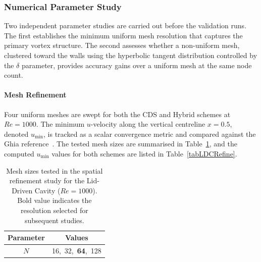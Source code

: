 \subsubsection{Numerical Parameter Study}
Two independent parameter studies are carried out before the validation runs. The first establishes the minimum uniform mesh resolution that captures the primary vortex structure. The second assesses whether a non-uniform mesh, clustered toward the walls using the hyperbolic tangent distribution controlled by the $\delta$ parameter, provides accuracy gains over a uniform mesh at the same node count.

\paragraph{Mesh Refinement}
Four uniform meshes are swept for both the CDS and Hybrid schemes at $Re = 1000$. The minimum $u$-velocity along the vertical centreline $x = 0.5$, denoted $u_{\min}$, is tracked as a scalar convergence metric and compared against the Ghia reference~\cite{Ghia1982}. The tested mesh sizes are summarised in Table~\ref{tabLDCNumerical}, and the computed $u_{\min}$ values for both schemes are listed in Table~\ref{tabLDCRefine}.

\begin{table}[ht]
    \centering
    \begin{tabular}{|c|c|}
        \hline
        Parameter & Values \\
        \hline
        $N$ & 16,\ 32,\ \textbf{64},\ 128 \\
        \hline
    \end{tabular}
    \caption{Mesh sizes tested in the spatial refinement study for the Lid-Driven Cavity ($Re = 1000$). Bold value indicates the resolution selected for subsequent studies.}
    \label{tabLDCNumerical}
\end{table}

